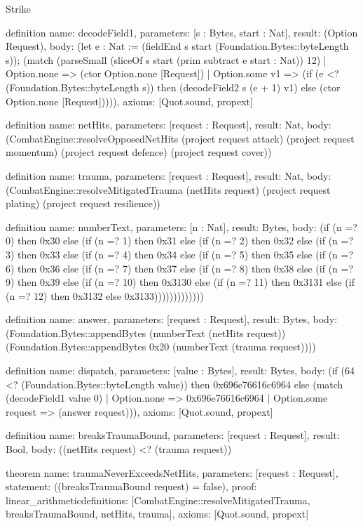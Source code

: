 \begin{lexlean}{Strike}
\begin{semanticmodule}
definition{
  name: decodeField1,
  parameters: [s : Bytes, start : Nat],
  result: (Option Request),
  body: (let e : Nat := (fieldEnd s start (Foundation.Bytes::byteLength s)); (match (parseSmall (sliceOf s start (prim subtract e start : Nat)) 12)
    | Option.none => (ctor Option.none [Request])
    | Option.some v1 => (if (e <? (Foundation.Bytes::byteLength s)) then (decodeField2 s (e + 1) v1) else (ctor Option.none [Request])))),
  axioms: [Quot.sound, propext]
}

definition{
  name: netHits,
  parameters: [request : Request],
  result: Nat,
  body: (CombatEngine::resolveOpposedNetHits (project request attack) (project request momentum) (project request defence) (project request cover))
}

definition{
  name: trauma,
  parameters: [request : Request],
  result: Nat,
  body: (CombatEngine::resolveMitigatedTrauma (netHits request) (project request plating) (project request resilience))
}

definition{
  name: numberText,
  parameters: [n : Nat],
  result: Bytes,
  body: (if (n =? 0) then 0x30 else (if (n =? 1) then 0x31 else (if (n =? 2) then 0x32 else (if (n =? 3) then 0x33 else (if (n =? 4) then 0x34 else (if (n =? 5) then 0x35 else (if (n =? 6) then 0x36 else (if (n =? 7) then 0x37 else (if (n =? 8) then 0x38 else (if (n =? 9) then 0x39 else (if (n =? 10) then 0x3130 else (if (n =? 11) then 0x3131 else (if (n =? 12) then 0x3132 else 0x3133)))))))))))))
}

definition{
  name: answer,
  parameters: [request : Request],
  result: Bytes,
  body: (Foundation.Bytes::appendBytes (numberText (netHits request)) (Foundation.Bytes::appendBytes 0x20 (numberText (trauma request))))
}

definition{
  name: dispatch,
  parameters: [value : Bytes],
  result: Bytes,
  body: (if (64 <? (Foundation.Bytes::byteLength value)) then 0x696e76616c6964 else (match (decodeField1 value 0)
    | Option.none => 0x696e76616c6964
    | Option.some request => (answer request))),
  axioms: [Quot.sound, propext]
}

definition{
  name: breaksTraumaBound,
  parameters: [request : Request],
  result: Bool,
  body: ((netHits request) <? (trauma request))
}

theorem{
  name: traumaNeverExceedsNetHits,
  parameters: [request : Request],
  statement: ((breaksTraumaBound request) = false),
  proof: linear_arithmetic{definitions: [CombatEngine::resolveMitigatedTrauma, breaksTraumaBound, netHits, trauma]},
  axioms: [Quot.sound, propext]
}


\end{semanticmodule}
\end{lexlean}
